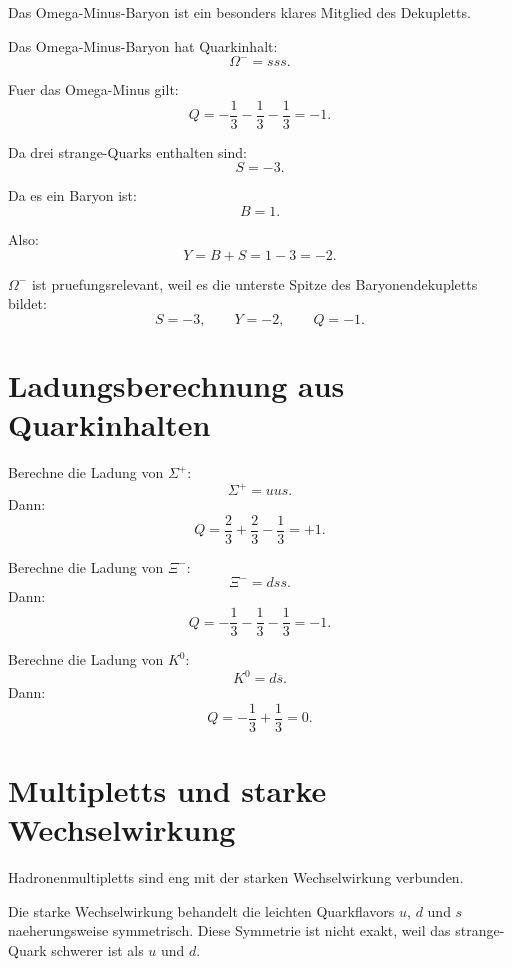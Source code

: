 Das Omega-Minus-Baryon ist ein besonders klares Mitglied des Dekupletts.

\begin{definitionbox}
Das Omega-Minus-Baryon hat Quarkinhalt:
\[
    \Omega^- = sss.
\]
\end{definitionbox}

\begin{conceptbox}
Fuer das Omega-Minus gilt:
\[
    Q
    =
    -\frac{1}{3}
    -
    \frac{1}{3}
    -
    \frac{1}{3}
    =
    -1.
\]

Da drei strange-Quarks enthalten sind:
\[
    S=-3.
\]

Da es ein Baryon ist:
\[
    B=1.
\]

Also:
\[
    Y=B+S=1-3=-2.
\]
\end{conceptbox}

\begin{examtipbox}
$\Omega^-$ ist pruefungsrelevant, weil es die unterste Spitze des
Baryonendekupletts bildet:
\[
    S=-3,
    \qquad
    Y=-2,
    \qquad
    Q=-1.
\]
\end{examtipbox}

\section{Ladungsberechnung aus Quarkinhalten}

\begin{examplebox}
Berechne die Ladung von $\Sigma^+$:
\[
    \Sigma^+ = uus.
\]
Dann:
\[
    Q
    =
    \frac{2}{3}
    +
    \frac{2}{3}
    -
    \frac{1}{3}
    =
    +1.
\]
\end{examplebox}

\begin{examplebox}
Berechne die Ladung von $\Xi^-$:
\[
    \Xi^- = dss.
\]
Dann:
\[
    Q
    =
    -\frac{1}{3}
    -
    \frac{1}{3}
    -
    \frac{1}{3}
    =
    -1.
\]
\end{examplebox}

\begin{examplebox}
Berechne die Ladung von $K^0$:
\[
    K^0=d\overline{s}.
\]
Dann:
\[
    Q
    =
    -\frac{1}{3}
    +
    \frac{1}{3}
    =
    0.
\]
\end{examplebox}

\section{Multipletts und starke Wechselwirkung}

\begin{conceptbox}
Hadronenmultipletts sind eng mit der starken Wechselwirkung verbunden.

Die starke Wechselwirkung behandelt die leichten Quarkflavors $u$, $d$ und $s$
naeherungsweise symmetrisch.
Diese Symmetrie ist nicht exakt, weil das strange-Quark schwerer ist als $u$ und $d$.
\end{conceptbox}

